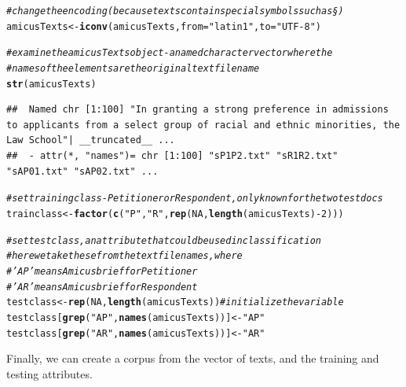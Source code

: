 \documentclass[11pt]{article}\usepackage[]{graphicx}\usepackage[]{color}
\makeatletter
\newcommand{\hlnum}[1]{\textcolor[rgb]{0.686,0.059,0.569}{#1}}%
\newcommand{\hlstr}[1]{\textcolor[rgb]{0.192,0.494,0.8}{#1}}%
\newcommand{\hlcom}[1]{\textcolor[rgb]{0.678,0.584,0.686}{\textit{#1}}}%
\newcommand{\hlopt}[1]{\textcolor[rgb]{0,0,0}{#1}}%
\newcommand{\hlstd}[1]{\textcolor[rgb]{0.345,0.345,0.345}{#1}}%
\newcommand{\hlkwb}[1]{\textcolor[rgb]{0.69,0.353,0.396}{#1}}%
\newcommand{\hlkwc}[1]{\textcolor[rgb]{0.333,0.667,0.333}{#1}}%
\newcommand{\hlkwd}[1]{\textcolor[rgb]{0.737,0.353,0.396}{\textbf{#1}}}%
\newenvironment{kframe}{%
 \def\at@end@of@kframe{}%
 \ifinner\ifhmode%
  \def\at@end@of@kframe{\end{minipage}}%
  \begin{minipage}{\columnwidth}%
 \fi\fi%
 \def\FrameCommand##1{\hskip\@totalleftmargin \hskip-\fboxsep
 \colorbox{shadecolor}{##1}\hskip-\fboxsep
     \hskip-\linewidth \hskip-\@totalleftmargin \hskip\columnwidth}%
 \MakeFramed {\advance\hsize-\width
   \@totalleftmargin\z@ \linewidth\hsize
   \@setminipage}}%
 {\par\unskip\endMakeFramed%
 \at@end@of@kframe}
\newenvironment{knitrout}{}{} %
\makeatother
\begin{document}
\begin{knitrout}\footnotesize
{}\color{fgcolor}\begin{kframe}
\begin{alltt}
\hlcom{# change the encoding (because texts contain special symbols such as §)}
\hlstd{amicusTexts} \hlkwb{<-} \hlkwd{iconv}\hlstd{(amicusTexts,} \hlkwc{from}\hlstd{=}\hlstr{"latin1"}\hlstd{,} \hlkwc{to}\hlstd{=}\hlstr{"UTF-8"}\hlstd{)}

\hlcom{# examine the amicusTexts object - a named character vector where the}
\hlcom{# names of the elements are the original text filename}
\hlkwd{str}\hlstd{(amicusTexts)}
\end{alltt}
\begin{verbatim}
##  Named chr [1:100] "In granting a strong preference in admissions to applicants from a select group of racial and ethnic minorities, the Law School"| __truncated__ ...
##  - attr(*, "names")= chr [1:100] "sP1P2.txt" "sR1R2.txt" "sAP01.txt" "sAP02.txt" ...
\end{verbatim}
\begin{alltt}
\hlcom{# set training class - Petitioner or Respondent, only known for the two test docs}
\hlstd{trainclass} \hlkwb{<-} \hlkwd{factor}\hlstd{(}\hlkwd{c}\hlstd{(}\hlstr{"P"}\hlstd{,} \hlstr{"R"}\hlstd{,} \hlkwd{rep}\hlstd{(}\hlnum{NA}\hlstd{,} \hlkwd{length}\hlstd{(amicusTexts)}\hlopt{-}\hlnum{2}\hlstd{)))}

\hlcom{# set test class, an attribute that could be used in classification}
\hlcom{# here we take these from the text filenames, where }
\hlcom{# 'AP' means Amicus brief for Petitioner}
\hlcom{# 'AR' means Amicus brief for Respondent}
\hlstd{testclass}  \hlkwb{<-} \hlkwd{rep}\hlstd{(}\hlnum{NA}\hlstd{,} \hlkwd{length}\hlstd{(amicusTexts))} \hlcom{# initialize the variable}
\hlstd{testclass[}\hlkwd{grep}\hlstd{(}\hlstr{"AP"}\hlstd{,} \hlkwd{names}\hlstd{(amicusTexts))]} \hlkwb{<-} \hlstr{"AP"}
\hlstd{testclass[}\hlkwd{grep}\hlstd{(}\hlstr{"AR"}\hlstd{,} \hlkwd{names}\hlstd{(amicusTexts))]} \hlkwb{<-} \hlstr{"AR"}
\end{alltt}
\end{kframe}
\end{knitrout}


Finally, we can create a corpus from the vector of texts, and the training and testing attributes.
\end{document}
